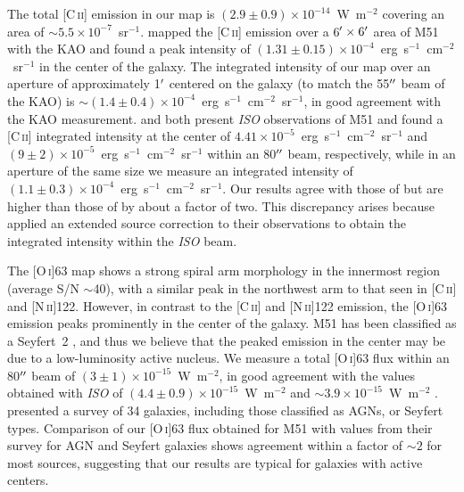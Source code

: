The total [C\,\textsc{ii}] emission in our map is $(2.9 \pm 0.9) \times 10^{-14}$~W~m$^{-2}$ covering an area of $\sim5.5 \times 10^{-7}$~sr$^{-1}$.  \citet{2001ApJ...561..203N} mapped the [C\,\textsc{ii}] emission over a 6$\mbox{$^\prime$} \times 6\mbox{$^\prime$}$ area of M51 with the KAO and found a peak intensity of $(1.31 \pm 0.15) \times 10^{-4}$~erg~s$^{-1}$~cm$^{-2}$~sr$^{-1}$ in the center of the galaxy.  The integrated intensity of our map over an aperture of approximately 1$\mbox{$^\prime$}$ centered on the galaxy (to match the 55$\mbox{$^{\prime\prime}$}$ beam of the KAO) is $\sim (1.4 \pm 0.4) \times 10^{-4}$~erg~s$^{-1}$~cm$^{-2}$~sr$^{-1}$, in good agreement with the KAO measurement.  \citet{2005A&A...441..961K} and \citet{2001A&A...375..566N} both present \emph{ISO} observations of M51 and found a [C\,\textsc{ii}] integrated intensity at the center of $4.41 \times 10^{-5}$~erg~s$^{-1}$~cm$^{-2}$~sr$^{-1}$ and $(9 \pm 2) \times 10^{-5}$~erg~s$^{-1}$~cm$^{-2}$~sr$^{-1}$ within an 80$\mbox{$^{\prime\prime}$}$ beam, respectively, while in an aperture of the same size we measure an integrated intensity of $(1.1 \pm 0.3) \times 10^{-4}$~erg~s$^{-1}$~cm$^{-2}$~sr$^{-1}$.  Our results agree with those of \citet{2001A&A...375..566N} but are higher than those of \citet{2005A&A...441..961K} by about a factor of two.  This discrepancy arises because \citet{2005A&A...441..961K} applied an extended source correction to their observations to obtain the integrated intensity within the \emph{ISO} beam.

The [O\,\textsc{i}]63 map shows a strong spiral arm morphology in the innermost region (average S/N $\sim$40), with a similar peak in the northwest arm to that seen in [C\,\textsc{ii}] and [N\,\textsc{ii}]122.  However, in contrast to the [C\,\textsc{ii}] and [N\,\textsc{ii}]122 emission, the [O\,\textsc{i}]63 emission peaks prominently in the center of the galaxy.  M51 has been classified as a Seyfert~2 \citep{1997ApJS..112..315H}, and thus we believe that the peaked emission in the center may be due to a low-luminosity active nucleus.  We measure a total [O\,\textsc{i}]63 flux within an 80$\mbox{$^{\prime\prime}$}$ beam of $(3 \pm 1) \times 10^{-15}$~W~m$^{-2}$, in good agreement with the values obtained with \emph{ISO} of $(4.4 \pm 0.9) \times 10^{-15}$~W~m$^{-2}$ \citep{2001A&A...375..566N} and $\sim3.9 \times 10^{-15}$~W~m$^{-2}$ \citep{2005A&A...441..961K}.  \citet{2001A&A...375..566N} presented a survey of 34 galaxies, including those classified as AGNs, or Seyfert types.  Comparison of our [O\,\textsc{i}]63 flux obtained for M51 with values from their survey for AGN and Seyfert galaxies shows agreement within a factor of $\sim2$ for most sources, suggesting that our results are typical for galaxies with active centers.

